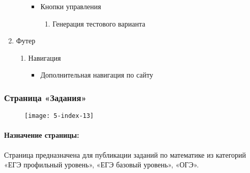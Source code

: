 \begin{enumerate}
\begin{enumerate}
\begin{itemize}
			\item Кнопки управления
			\begin{enumerate}
				\item Генерация тестового варианта
			\end{enumerate}
		\end{itemize}
	\end{enumerate}

	\item Футер
	\begin{enumerate}
		\item Навигация
		\begin{itemize}
			\item Дополнительная навигация по сайту
		\end{itemize}
	\end{enumerate}
\end{enumerate}


\subsubsection{Страница «Задания»}
\begin{figure}[H]
\texttt{[image: 5-index-13]}
\end{figure}
\paragraph{Назначение страницы:} Страница предназначена для публикации заданий по математике из категорий «ЕГЭ профильный уровень», «ЕГЭ базовый уровень», «ОГЭ».

